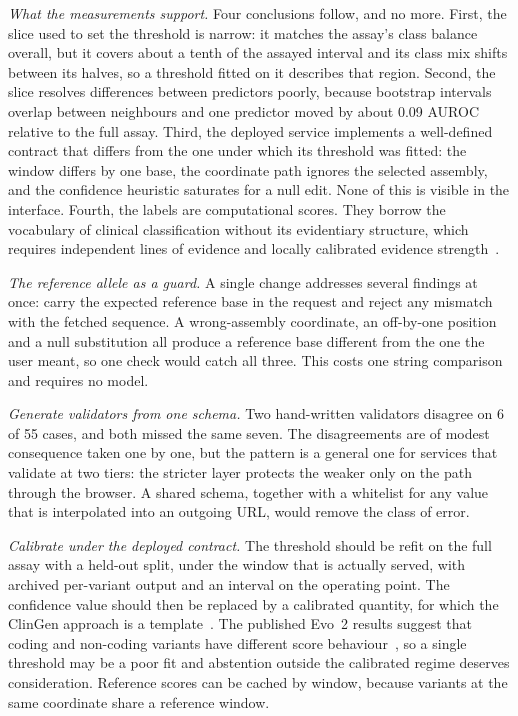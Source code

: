 \documentclass[10pt,journal,a4paper]{IEEEtran}
\begin{document}
\textit{What the measurements support.} Four conclusions follow, and no more. First, the slice used to set the threshold is narrow: it matches the assay's class balance overall, but it covers about a tenth of the assayed interval and its class mix shifts between its halves, so a threshold fitted on it describes that region. Second, the slice resolves differences between predictors poorly, because bootstrap intervals overlap between neighbours and one predictor moved by about 0.09 AUROC relative to the full assay. Third, the deployed service implements a well-defined contract that differs from the one under which its threshold was fitted: the window differs by one base, the coordinate path ignores the selected assembly, and the confidence heuristic saturates for a null edit. None of this is visible in the interface. Fourth, the labels are computational scores. They borrow the vocabulary of clinical classification without its evidentiary structure, which requires independent lines of evidence and locally calibrated evidence strength~\cite{richards2015acmg,pejaver2022svi}.

\textit{The reference allele as a guard.} A single change addresses several findings at once: carry the expected reference base in the request and reject any mismatch with the fetched sequence. A wrong-assembly coordinate, an off-by-one position and a null substitution all produce a reference base different from the one the user meant, so one check would catch all three. This costs one string comparison and requires no model.

\textit{Generate validators from one schema.} Two hand-written validators disagree on 6 of 55 cases, and both missed the same seven. The disagreements are of modest consequence taken one by one, but the pattern is a general one for services that validate at two tiers: the stricter layer protects the weaker only on the path through the browser. A shared schema, together with a whitelist for any value that is interpolated into an outgoing URL, would remove the class of error.

\textit{Calibrate under the deployed contract.} The threshold should be refit on the full assay with a held-out split, under the window that is actually served, with archived per-variant output and an interval on the operating point. The confidence value should then be replaced by a calibrated quantity, for which the ClinGen approach is a template~\cite{pejaver2022svi}. The published Evo~2 results suggest that coding and non-coding variants have different score behaviour~\cite{brixi2026evo2}, so a single threshold may be a poor fit and abstention outside the calibrated regime deserves consideration. Reference scores can be cached by window, because variants at the same coordinate share a reference window.
\end{document}
